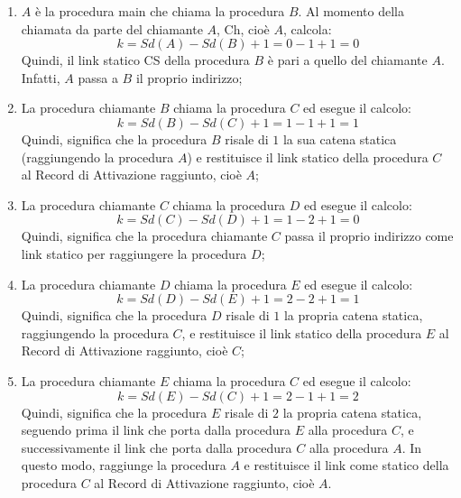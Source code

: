 \documentclass[a4paper]{article}
\begin{document}
	\begin{enumerate}
		\item $A$ è la procedura \textsf{main} che chiama la procedura $B$. Al momento della chiamata da parte del chiamante $A$, Ch, cioè $A$, calcola:
		\begin{equation*}
			k = Sd\left(A\right) - Sd\left(B\right) + 1 = 0 - 1 + 1 = 0
		\end{equation*}
		Quindi, il link statico CS della procedura $B$ è pari a quello del chiamante $A$. Infatti, $A$ passa a $B$ il proprio indirizzo;
		
		\item La procedura chiamante $B$ chiama la procedura $C$ ed esegue il calcolo:
		\begin{equation*}
			k = Sd\left(B\right) - Sd\left(C\right) + 1 = 1 - 1 + 1 = 1
		\end{equation*}
		Quindi, significa che la procedura $B$ risale di $1$ la sua catena statica (raggiungendo la procedura $A$) e restituisce il link statico della procedura $C$ al Record di Attivazione raggiunto, cioè $A$;
		
		\item La procedura chiamante $C$ chiama la procedura $D$ ed esegue il calcolo:
		\begin{equation*}
			k = Sd\left(C\right) - Sd\left(D\right) + 1 = 1 - 2 + 1 = 0
		\end{equation*}
		Quindi, significa che la procedura chiamante $C$ passa il proprio indirizzo come link statico per raggiungere la procedura $D$;
		
		\item La procedura chiamante $D$ chiama la procedura $E$ ed esegue il calcolo:
		\begin{equation*}
			k = Sd\left(D\right) - Sd\left(E\right) + 1 = 2 - 2 + 1 = 1
		\end{equation*}
		Quindi, significa che la procedura $D$ risale di $1$ la propria catena statica, raggiungendo la procedura $C$, e restituisce il link statico della procedura $E$ al Record di Attivazione raggiunto, cioè $C$;
		
		\item La procedura chiamante $E$ chiama la procedura $C$ ed esegue il calcolo:
		\begin{equation*}
			k = Sd\left(E\right) - Sd\left(C\right) + 1 = 2 - 1 + 1 = 2
		\end{equation*}
		Quindi, significa che la procedura $E$ risale di $2$ la propria catena statica, seguendo prima il link che porta dalla procedura $E$ alla procedura $C$, e successivamente il link che porta dalla procedura $C$ alla procedura $A$. In questo modo, raggiunge la procedura $A$ e restituisce il link come statico della procedura $C$ al Record di Attivazione raggiunto, cioè $A$.
	\end{enumerate}
\end{document}
